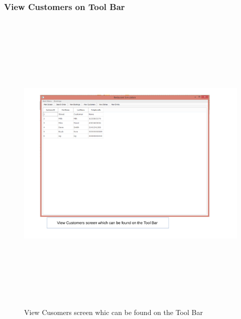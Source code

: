 \begin{landscape}
\subsubsection{View Customers on Tool Bar}
\begin{figure}[H]
    \includegraphics[height = 15cm]{./Maintenance/images/screen19}
    \caption{View Cusomers screen whic can be found on the Tool Bar} \label{fig:screen19}
\end{figure}


\end{landscape}
